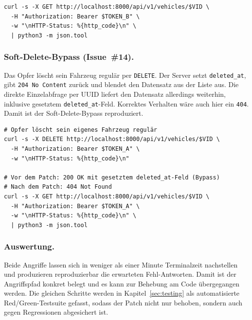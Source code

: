 \begin{lstlisting}[style=custombash, caption={IDOR per API. Vor dem Patch \texttt{200 OK} mit Opferdaten, nach dem Patch \texttt{404 Not Found}.}]
curl -s -X GET http://localhost:8000/api/v1/vehicles/$VID \
  -H "Authorization: Bearer $TOKEN_B" \
  -w "\nHTTP-Status: %{http_code}\n" \
  | python3 -m json.tool
\end{lstlisting}

\subsubsection{Soft-Delete-Bypass (Issue~\#14).}
Das Opfer löscht sein Fahrzeug regulär per \texttt{DELETE}. Der Server
setzt \texttt{deleted\_at}, gibt \texttt{204 No Content} zurück und
blendet den Datensatz aus der Liste aus. Die direkte Einzelabfrage per
UUID liefert den Datensatz allerdings weiterhin, inklusive gesetztem
\texttt{deleted\_at}-Feld. Korrektes Verhalten wäre auch hier ein
\texttt{404}. Damit ist der Soft-Delete-Bypass reproduziert.

\begin{lstlisting}[style=custombash, caption={Soft-Delete-Bypass: Der Datensatz wird gelöscht, aber per GET weiterhin ausgeliefert.}]
# Opfer löscht sein eigenes Fahrzeug regulär
curl -s -X DELETE http://localhost:8000/api/v1/vehicles/$VID \
  -H "Authorization: Bearer $TOKEN_A" \
  -w "\nHTTP-Status: %{http_code}\n"

# Vor dem Patch: 200 OK mit gesetztem deleted_at-Feld (Bypass)
# Nach dem Patch: 404 Not Found
curl -s -X GET http://localhost:8000/api/v1/vehicles/$VID \
  -H "Authorization: Bearer $TOKEN_A" \
  -w "\nHTTP-Status: %{http_code}\n" \
  | python3 -m json.tool
\end{lstlisting}

\subsubsection{Auswertung.}
Beide Angriffe lassen sich in weniger als einer Minute Terminalzeit
nachstellen und produzieren reproduzierbar die erwarteten
Fehl-Antworten. Damit ist der Angriffspfad konkret belegt und es kann
zur Behebung am Code übergegangen werden. Die gleichen Schritte werden
in Kapitel~\ref{sec:testing} als automatisierte Red/Green-Testsuite
gefasst, sodass der Patch nicht nur behoben, sondern auch gegen
Regressionen abgesichert ist.
